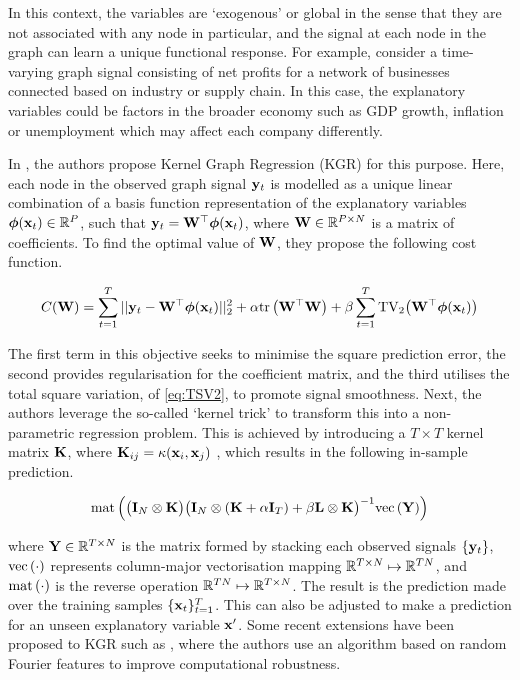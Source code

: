In this context, the variables are `exogenous' or global in the sense that they are not associated with any node in particular, and the signal at each node in the graph can learn a unique functional response. For example, consider a time-varying graph signal consisting of net profits for a network of businesses connected based on industry or supply chain. In this case, the explanatory variables could be factors in the broader economy such as GDP growth, inflation or unemployment which may affect each company differently. 

In \cite{Venkitaraman2019}, the authors propose Kernel Graph Regression (KGR) for this purpose. Here, each node in the observed graph signal $\mathbf{y}_t$ is modelled as a unique linear combination of a basis function representation of the explanatory variables $\boldsymbol{\phi}(\mathbf{x}_t) \in \mathbb{R}^P$, such that $\mathbf{y}_t = \mathbf{W}^\top \boldsymbol{\phi}(\mathbf{x}_t)$, where $\mathbf{W} \in \mathbb{R}^{P \times N}$ is a matrix of coefficients. To find the optimal value of $\mathbf{W}$, they propose the following cost function. 

\begin{equation}
    C(\mathbf{W}) = \sum_{t=1}^T ||\mathbf{y}_t - \mathbf{W}^\top \boldsymbol{\phi}(\mathbf{x}_t) ||_2^2 + \alpha \text{\textup{tr}}\left(\mathbf{W}^\top \mathbf{W}\right) + \beta \sum_{t=1}^T \text{TV}_2\big(\mathbf{W}^\top \boldsymbol{\phi}(\mathbf{x}_t)\big)
\end{equation}

The first term in this objective seeks to minimise the square prediction error, the second provides regularisation for the coefficient matrix, and the third utilises the total square variation, of \cref{eq:TSV2}, to promote signal smoothness. Next, the authors leverage the so-called `kernel trick' to transform this into a non-parametric regression problem. This is achieved by introducing a $T \times T$ kernel matrix $\mathbf{K}$, where $\mathbf{K}_{ij} = \kappa(\mathbf{x}_i, \mathbf{x}_j)$ \citep{Rasmussen2005}, which results in the following in-sample prediction. 

\begin{equation}
    \text{\textup{mat}}\left(\big(\mathbf{I}_N \otimes \mathbf{K}\big)\big(\mathbf{I}_N \otimes (\mathbf{K} + \alpha \mathbf{I}_T) + \beta \mathbf{L} \otimes \mathbf{K} \big)^{-1} \text{\textup{vec}}\left(\mathbf{Y}\right)\right)
\end{equation}

where $\mathbf{Y} \in \mathbb{R}^{T \times N}$ is the matrix formed by stacking each observed signals $\{\mathbf{y}_t\}$, $\text{\textup{vec}}\left(\cdot\right)$ represents column-major vectorisation mapping $\mathbb{R}^{T \times N} \mapsto \mathbb{R}^{TN}$, and $\text{\textup{mat}}\left(\cdot\right)$ is the reverse operation $\mathbb{R}^{TN}\mapsto  \mathbb{R}^{T \times N}$. The result is the prediction made over the training samples $\{\mathbf{x}_t\}_{t=1}^T$. This can also be adjusted to make a prediction for an unseen explanatory variable $\mathbf{x}'$. Some recent extensions have been proposed to KGR such as \cite{Elias2022}, where the authors use an algorithm based on random Fourier features to improve computational robustness. 

